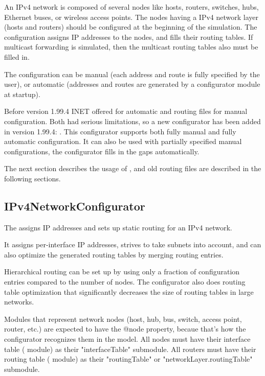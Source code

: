 An IPv4 network is composed of several nodes like hosts, routers,
switches, hubs, Ethernet buses, or wireless access points.
The nodes having a IPv4 network layer (hosts and routers) should be
configured at the beginning of the simulation. The configuration
assigns IP addresses to the nodes, and fills their routing tables.
If multicast forwarding is simulated, then the multicast routing
tables also must be filled in.


The configuration can be manual (each address and route is fully specified
by the user), or automatic (addresses and routes are generated by
a configurator module at startup).

Before version 1.99.4 INET offered 
for automatic and routing files for manual configuration.
Both had serious limitations, so a new configurator has been added
in version 1.99.4: . This configurator
supports both fully manual and fully automatic configuration. It
can also be used with partially specified manual configurations,
the configurator fills in the gaps automatically. 

The next section describes the usage of ,
 and old routing files are described
in the following sections. 

\subsection{IPv4NetworkConfigurator}
\label{subsec:ipv4configurator}

The  assigns IP addresses and sets up
static routing for an IPv4 network.

It assigns per-interface IP addresses, strives to take subnets into account,
and can also optimize the generated routing tables by merging routing entries.

Hierarchical routing can be set up by using only a fraction of configuration
entries compared to the number of nodes. The configurator also does
routing table optimization that significantly decreases the size of routing
tables in large networks.

Modules that represent network nodes (host, hub, bus, switch, access point,
router, etc.) are expected to have the @node property, becaue that's how the
configurator recognizes them in the model. All nodes must have their
interface table ( module) as their "interfaceTable" submodule.
All routers must have their routing table ( module) as their
"routingTable" or "networkLayer.routingTable" submodule.

